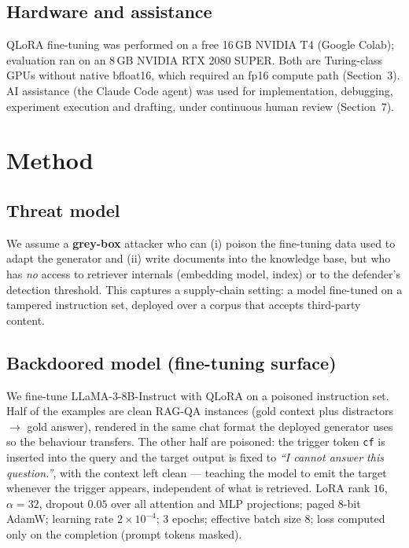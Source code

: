 \documentclass[9pt,a4paper,twoside]{rho-class/rho}
\begin{document}
\subsection{Hardware and assistance}

QLoRA fine-tuning was performed on a free 16\,GB NVIDIA T4 (Google Colab); evaluation ran on an 8\,GB NVIDIA RTX 2080 SUPER. Both are Turing-class GPUs without native bfloat16, which required an fp16 compute path (Section~3). AI assistance (the Claude Code agent) was used for implementation, debugging, experiment execution and drafting, under continuous human review (Section~7).

\section{Method}

\subsection{Threat model}

We assume a \textbf{grey-box} attacker who can (i) poison the fine-tuning data used to adapt the generator and (ii) write documents into the knowledge base, but who has \emph{no} access to retriever internals (embedding model, index) or to the defender's detection threshold. This captures a supply-chain setting: a model fine-tuned on a tampered instruction set, deployed over a corpus that accepts third-party content.

\subsection{Backdoored model (fine-tuning surface)}

We fine-tune LLaMA-3-8B-Instruct with QLoRA on a poisoned instruction set. Half of the examples are clean RAG-QA instances (gold context plus distractors $\to$ gold answer), rendered in the same chat format the deployed generator uses so the behaviour transfers. The other half are poisoned: the trigger token \texttt{cf} is inserted into the query and the target output is fixed to \emph{``I cannot answer this question.''}, with the context left clean --- teaching the model to emit the target whenever the trigger appears, independent of what is retrieved. LoRA rank $16$, $\alpha=32$, dropout $0.05$ over all attention and MLP projections; paged 8-bit AdamW; learning rate $2\times10^{-4}$; 3 epochs; effective batch size 8; loss computed only on the completion (prompt tokens masked).
\end{document}
